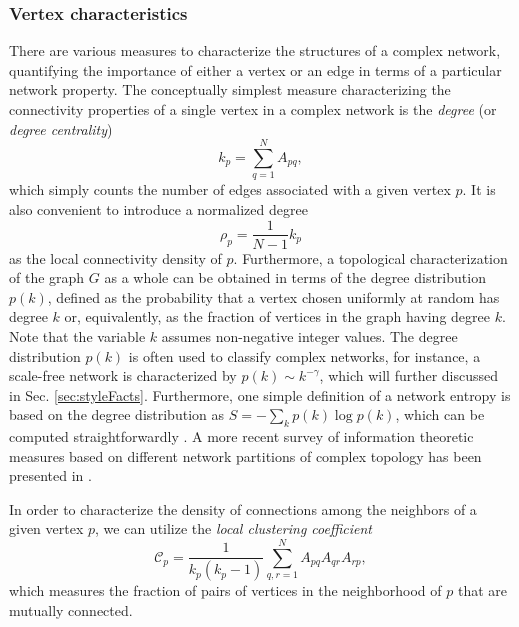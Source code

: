 		\subsubsection{Vertex characteristics}
		There are various measures to characterize the structures of a complex network, quantifying the importance of either a vertex or an edge in terms of a particular network property. The conceptually simplest measure characterizing the connectivity properties of a single vertex in a complex network is the \textit{degree} (or \textit{degree centrality})
\begin{equation} 
k_p=\sum_{q=1}^N A_{pq} ,
\label{eq:degree}
\end{equation}
\noindent
which simply counts the number of edges associated with a given vertex $p$. It is also convenient to introduce a normalized degree 
\begin{equation} \label{eq:localrho}
\rho_p = \frac{1}{N-1} k_p
\end{equation}
as the local connectivity density of $p$. Furthermore, a topological characterization of the graph $G$ as a whole can be obtained in terms of the degree distribution $p(k)$, defined as the probability that a vertex chosen uniformly at random has degree $k$ or, equivalently, as the fraction of vertices in the graph having degree $k$. Note that the variable $k$ assumes non-negative integer values. The degree distribution $p(k)$ is often used to classify complex networks, for instance, a scale-free network is characterized by $p(k) \sim k^{-\gamma}$, which will further discussed in Sec. \ref{sec:styleFacts}. Furthermore, one simple definition of a network entropy  is based on the degree distribution as $S = - \sum_{k} p(k) \log p(k)$, which can be computed straightforwardly \cite{Rashevsky1955,MacArthur1955}. A more recent survey of information theoretic measures based on different network partitions of complex topology has been presented in \cite{Dehmer2011}. 

		In order to characterize the density of connections among the neighbors of a given vertex $p$, we can utilize the \textit{local clustering coefficient}
\begin{equation}
  {\mathcal{C}}_p =\frac{1}{  {k}_p (  {k}_p -1)} \sum_{q,r=1}^N A_{pq}  A_{qr}  A_{rp} ,
\label{eq:locclustering}
\end{equation}
\noindent
which measures the fraction of pairs of vertices in the neighborhood of $p$ that are mutually connected. 

